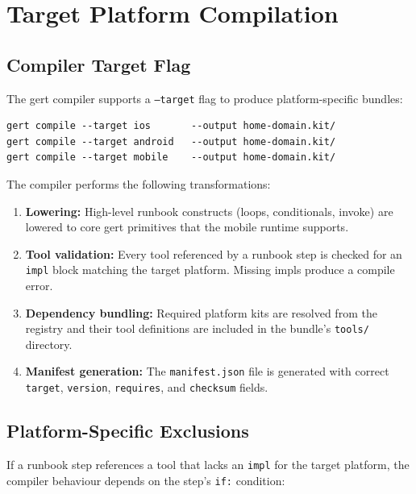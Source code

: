 \section{Target Platform Compilation}

\subsection{Compiler Target Flag}

The gert compiler supports a \texttt{--target} flag to produce platform-specific bundles:

\begin{verbatim}
gert compile --target ios       --output home-domain.kit/
gert compile --target android   --output home-domain.kit/
gert compile --target mobile    --output home-domain.kit/
\end{verbatim}

The compiler performs the following transformations:

\begin{enumerate}
  \item \textbf{Lowering:} High-level runbook constructs (loops, conditionals, invoke) are lowered to core gert primitives that the mobile runtime supports.
  \item \textbf{Tool validation:} Every tool referenced by a runbook step is checked for an \texttt{impl} block matching the target platform. Missing impls produce a compile error.
  \item \textbf{Dependency bundling:} Required platform kits are resolved from the registry and their tool definitions are included in the bundle's \texttt{tools/} directory.
  \item \textbf{Manifest generation:} The \texttt{manifest.json} file is generated with correct \texttt{target}, \texttt{version}, \texttt{requires}, and \texttt{checksum} fields.
\end{enumerate}

\subsection{Platform-Specific Exclusions}

If a runbook step references a tool that lacks an \texttt{impl} for the target platform, the compiler behaviour depends on the step's \texttt{if:} condition:

